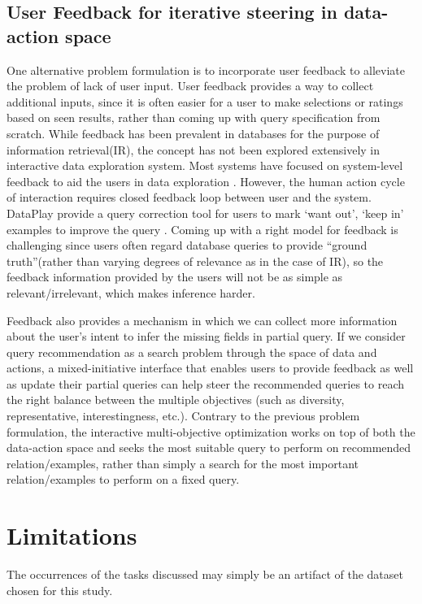 \documentclass{sig-alternate-05-2015}
\begin{document}
\subsection{User Feedback for iterative steering in data-action space}
One alternative problem formulation is to incorporate user feedback to alleviate the problem of lack of user input. 
User feedback provides a way to collect additional inputs, since it is often easier for a user to make selections or ratings based on seen results, rather than coming up with query specification from scratch. While feedback has been prevalent in databases for the purpose of information retrieval(IR), the concept has not been explored extensively in interactive data exploration system. Most systems have focused on system-level feedback to aid the users in data exploration \cite{Nandi2013,Jiang2015}. However, the human action cycle of interaction requires closed feedback loop between user and the system\cite{Norman2013}. DataPlay provide a query correction tool for users to mark `want out', `keep in' examples to improve the query \cite{Abouzied2012}. Coming up with a right model for feedback is challenging since users often regard database queries to provide ``ground truth''(rather than varying degrees of relevance as in the case of IR), so the feedback information provided by the users will not be as simple as relevant/irrelevant, which makes inference harder.
\par Feedback also provides a mechanism in which we can collect more information about the user's intent to infer the missing fields in partial query. If we consider query recommendation as a search problem through the space of data and actions, a mixed-initiative interface that enables users to provide feedback as well as update their partial queries can help steer the recommended queries to reach the right balance between the multiple objectives (such as diversity, representative, interestingness, etc.). Contrary to the previous problem formulation, the interactive multi-objective optimization works on top of both the data-action space and seeks the most suitable query to perform on recommended relation/examples, rather than simply a search for the most important relation/examples to perform on a fixed query.
\section{Limitations}
The occurrences of the tasks discussed may simply be an artifact of the dataset chosen for this study. 
\end{document}
